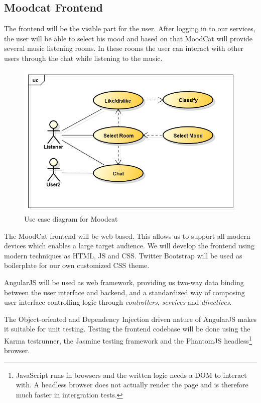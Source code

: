 \subsection{Moodcat Frontend}
The frontend will be the visible part for the user.
After logging in to our services, the user will be able to select his mood and based on that MoodCat will provide several music listening rooms.
In these rooms the user can interact with other users through the chat while listening to the music.

\begin{figure}[H]
\includegraphics[scale=.4]{useCases.png}
\caption{Use case diagram for Moodcat}
\label{fig:MoodCatUseCase}
\end{figure}

\par
The MoodCat frontend will be web-based.
This allows us to support all modern devices which enables a large target audience.
We will develop the frontend using modern techniques as \Gls{HTML}\cite{HTML}, \Gls{JS} and \Gls{CSS}\cite{CSS}.
Twitter Bootstrap will be used as boilerplate for our own customized CSS theme.

\par
AngularJS\cite{AngularJS} will be used as web framework, providing us two-way data binding between the user interface and backend, and a standardized way of composing user interface controlling logic through \textit{controllers}, \textit{services} and \textit{directives}.

\par
The Object-oriented\cite{Wirfs-Brock} and Dependency Injection\cite{angularDI} driven nature of AngularJS makes it suitable for unit testing\cite{Binder}.
Testing the frontend codebase will be done using the Karma\cite{Karma} testrunner, the Jasmine\cite{Jasmine} testing framework and the PhantomJS\cite{PhantomJS} headless\footnote{JavaScript runs in browsers and the written logic needs a DOM to interact with. A headless browser does not actually render the page and is therefore much faster in intergration tests.} browser.

